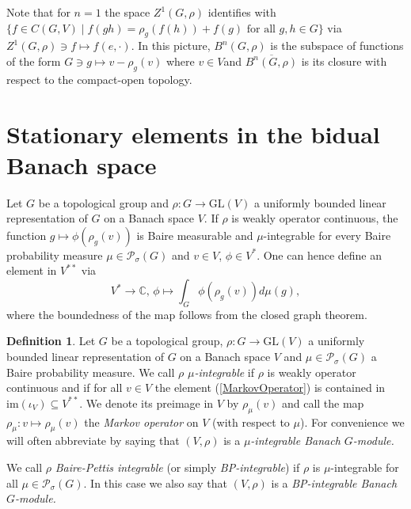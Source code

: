 \documentclass[a4paper,11pt,reqno]{amsart}
\numberwithin{equation}{section}
\theoremstyle{definition}
\newtheorem{definition}[theorem]{Definition}
\theoremstyle{remark}
\theoremstyle{remark}
\begin{document}
Note that for $n=1$ the space $Z^{1}(G,\rho)$ identifies with $\{f\in C(G,V)\mid f(gh)=\rho_{g}(f(h))+f(g)\text{ for all }g,h\in G\}$ via $Z^{1}(G,\rho)\ni f\mapsto f(e,\cdot)$. In this picture, $B^{n}(G,\rho)$ is the subspace of functions of the form $G\ni g\mapsto v-\rho_{g}(v)$ where $v\in V$and $\overline{B^{n}(G,\rho)}$ is its closure with respect to the compact-open topology.

\vspace{3mm}


\section{Stationary elements in the bidual Banach space\label{StationaryElements}}

Let $G$ be a topological group and $\rho:G\rightarrow\text{GL}(V)$ a uniformly bounded linear representation of $G$ on a Banach space $V$. If $\rho$ is weakly operator continuous, the function $g\mapsto\phi(\rho_{g}(v))$ is Baire measurable and $\mu$-integrable for every Baire probability measure $\mu\in\mathcal{P}_{\sigma}(G)$ and $v\in V$, $\phi\in V^{\ast}$. One can hence define an element in $V^{\ast\ast}$ via 
\begin{equation}
V^{\ast}\rightarrow\mathbb{C}, \, \phi\mapsto\int_{G}\phi\left(\rho_{g}(v)\right)d\mu(g),\label{MarkovOperator}
\end{equation}
where the boundedness of the map follows from the closed graph theorem.

\begin{definition} \label{PettisIntegrableDefinition} Let $G$ be a topological group, $\rho:G\rightarrow\text{GL}(V)$ a uniformly bounded linear representation of $G$ on a Banach space $V$ and $\mu\in\mathcal{P}_{\sigma}(G)$ a Baire probability measure. We call $\rho$ \emph{$\mu$-integrable} if $\rho$ is weakly operator continuous and if for all $v\in V$ the element (\ref{MarkovOperator}) is contained in $\text{im}(\iota_{V})\subseteq V^{\ast\ast}$. We denote its preimage in $V$ by $\rho_{\mu}(v)$ and call the map $\rho_{\mu}:v\mapsto\rho_{\mu}(v)$ the \emph{Markov operator} on $V$ (with respect to $\mu$). For convenience we will often abbreviate by saying that $(V,\rho)$ is a \emph{$\mu$-integrable Banach $G$-module.}

We call $\rho$ \emph{Baire-Pettis integrable} (or simply \emph{BP-integrable}) if $\rho$ is $\mu$-integrable for all $\mu\in\mathcal{P}_{\sigma}(G)$. In this case we also say that $(V,\rho)$ is a \emph{BP-integrable Banach $G$-module.} \end{definition}
\end{document}

